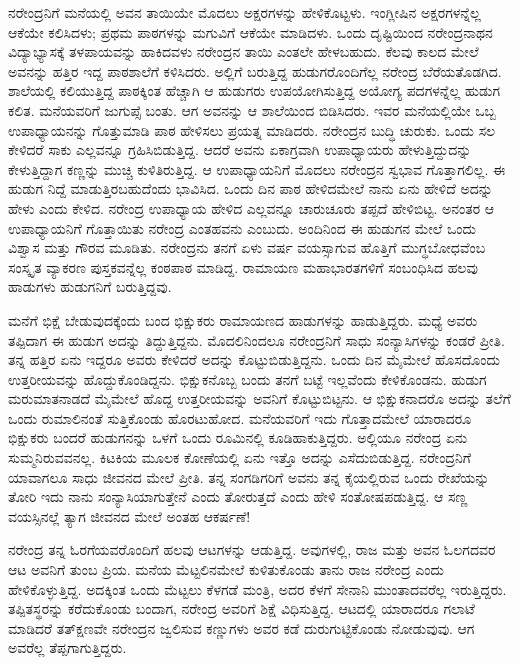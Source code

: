 ನರೇಂದ್ರನಿಗೆ ಮನೆಯಲ್ಲಿ ಅವನ ತಾಯಿಯೇ ಮೊದಲು ಅಕ್ಷರಗಳನ್ನು ಹೇಳಿಕೊಟ್ಟಳು. ಇಂಗ್ಲೀಷಿನ ಅಕ್ಷರಗಳನ್ನೆಲ್ಲ ಆಕೆಯೇ ಕಲಿಸಿದಳು; ಪ್ರಥಮ ಪಾಠಗಳನ್ನು ಮಗುವಿಗೆ ಆಕೆಯೇ ಮಾಡಿದಳು. ಒಂದು ದೃಷ್ಟಿಯಿಂದ ನರೇಂದ್ರನಾಥನ ವಿದ್ಯಾಭ್ಯಾಸಕ್ಕೆ ತಳಪಾಯವನ್ನು ಹಾಕಿದವಳು ನರೇಂದ್ರನ ತಾಯಿ ಎಂತಲೇ ಹೇಳಬಹುದು. ಕೆಲವು ಕಾಲದ ಮೇಲೆ ಅವನನ್ನು ಹತ್ತಿರ ಇದ್ದ ಪಾಠಶಾಲೆಗೆ ಕಳಿಸಿದರು. ಅಲ್ಲಿಗೆ ಬರುತ್ತಿದ್ದ ಹುಡುಗರೊಂದಿಗೆಲ್ಲ ನರೇಂದ್ರ ಬೆರೆಯತೊಡಗಿದ. ಶಾಲೆಯಲ್ಲಿ ಕಲಿಯುತ್ತಿದ್ದ ಪಾಠಕ್ಕಿಂತ ಹೆಚ್ಚಾಗಿ ಆ ಹುಡುಗರು ಉಪಯೋಗಿಸುತ್ತಿದ್ದ ಅಯೋಗ್ಯ ಪದಗಳನ್ನೆಲ್ಲ ಹುಡುಗ ಕಲಿತ. ಮನೆಯವರಿಗೆ ಜುಗುಪ್ಸೆ ಬಂತು. ಆಗ ಅವನನ್ನು ಆ ಶಾಲೆಯಿಂದ ಬಿಡಿಸಿದರು. ಇವರ ಮನೆಯಲ್ಲಿಯೇ ಒಬ್ಬ ಉಪಾಧ್ಯಾಯನನ್ನು ಗೊತ್ತುಮಾಡಿ ಪಾಠ ಹೇಳಿಸಲು ಪ್ರಯತ್ನ ಮಾಡಿದರು. ನರೇಂದ್ರನ ಬುದ್ಧಿ ಚುರುಕು. ಒಂದು ಸಲ ಕೇಳಿದರೆ ಸಾಕು ಎಲ್ಲವನ್ನೂ ಗ್ರಹಿಸಿಬಿಡುತ್ತಿದ್ದ. ಆದರೆ ಅವನು ಏಕಾಗ್ರವಾಗಿ ಉಪಾಧ್ಯಾಯರು ಹೇಳುತ್ತಿದ್ದುದನ್ನು ಕೇಳುತ್ತಿದ್ದಾಗ ಕಣ್ಣನ್ನು ಮುಚ್ಚಿ ಕುಳಿತಿರುತ್ತಿದ್ದ. ಆ ಉಪಾಧ್ಯಾಯನಿಗೆ ಮೊದಲು ನರೇಂದ್ರನ ಸ್ವಭಾವ ಗೊತ್ತಾಗಲಿಲ್ಲ. ಈ ಹುಡುಗ ನಿದ್ದೆ ಮಾಡುತ್ತಿರಬಹುದೆಂದು ಭಾವಿಸಿದ. ಒಂದು ದಿನ ಪಾಠ ಹೇಳಿದಮೇಲೆ ನಾನು ಏನು ಹೇಳಿದೆ ಅದನ್ನು ಹೇಳು ಎಂದು ಕೇಳಿದ. ನರೇಂದ್ರ ಉಪಾಧ್ಯಾಯ ಹೇಳಿದ ಎಲ್ಲವನ್ನೂ ಚಾರುಚೂರು ತಪ್ಪದೆ ಹೇಳಿಬಿಟ್ಟ. ಅನಂತರ ಆ ಉಪಾಧ್ಯಾಯನಿಗೆ ಗೊತ್ತಾಯಿತು ನರೇಂದ್ರ ಎಂತಹವನು ಎಂಬುದು. ಅಂದಿನಿಂದ ಈ ಹುಡುಗನ ಮೇಲೆ ಒಂದು ವಿಶ್ವಾಸ ಮತ್ತು ಗೌರವ ಮೂಡಿತು. ನರೇಂದ್ರನು ತನಗೆ ಏಳು ವರ್ಷ ವಯಸ್ಸಾಗುವ ಹೊತ್ತಿಗೆ ಮುಗ್ಧಬೋಧವೆಂಬ ಸಂಸ್ಕೃತ ವ್ಯಾಕರಣ ಪುಸ್ತಕವನ್ನೆಲ್ಲ ಕಂಠಪಾಠ ಮಾಡಿದ್ದ. ರಾಮಾಯಣ ಮಹಾಭಾರತಗಳಿಗೆ ಸಂಬಂಧಿಸಿದ ಹಲವು ಹಾಡುಗಳು ಹುಡುಗನಿಗೆ ಬರುತ್ತಿದ್ದವು.

ಮನೆಗೆ ಭಿಕ್ಷೆ ಬೇಡುವುದಕ್ಕೆಂದು ಬಂದ ಭಿಕ್ಷುಕರು ರಾಮಾಯಣದ ಹಾಡುಗಳನ್ನು ಹಾಡುತ್ತಿದ್ದರು. ಮಧ್ಯೆ ಅವರು ತಪ್ಪಿದಾಗ ಈ ಹುಡುಗ ಅದನ್ನು ತಿದ್ದುತ್ತಿದ್ದನು. ಮೊದಲಿನಿಂದಲೂ ನರೇಂದ್ರನಿಗೆ ಸಾಧು ಸಂನ್ಯಾಸಿಗಳನ್ನು ಕಂಡರೆ ಪ್ರೀತಿ. ತನ್ನ ಹತ್ತಿರ ಏನು ಇದ್ದರೂ ಅವರು ಕೇಳಿದರೆ ಅದನ್ನು ಕೊಟ್ಟುಬಿಡುತ್ತಿದ್ದನು. ಒಂದು ದಿನ ಮೈಮೇಲೆ ಹೊಸದೊಂದು ಉತ್ತರೀಯವನ್ನು ಹೊದ್ದುಕೊಂಡಿದ್ದನು. ಭಿಕ್ಷುಕನೊಬ್ಬ ಬಂದು ತನಗೆ ಬಟ್ಟೆ ಇಲ್ಲವೆಂದು ಕೇಳಿಕೊಂಡನು. ಹುಡುಗ ಮರುಮಾತನಾಡದೆ ಮೈಮೇಲೆ ಹೊದ್ದ ಉತ್ತರೀಯವನ್ನು ಅವನಿಗೆ ಕೊಟ್ಟುಬಿಟ್ಟನು. ಆ ಭಿಕ್ಷುಕನಾದರೊ ಅದನ್ನು ತಲೆಗೆ ಒಂದು ರುಮಾಲಿನಂತೆ ಸುತ್ತಿಕೊಂಡು ಹೊರಟುಹೋದ. ಮನೆಯವರಿಗೆ ಇದು ಗೊತ್ತಾದಮೇಲೆ ಯಾರಾದರೂ ಭಿಕ್ಷುಕರು ಬಂದರೆ ಹುಡುಗನನ್ನು ಒಳಗೆ ಒಂದು ರೂಮಿನಲ್ಲಿ ಕೂಡಿಹಾಕುತ್ತಿದ್ದರು. ಅಲ್ಲಿಯೂ ನರೇಂದ್ರ ಏನು ಸುಮ್ಮನಿರುವವನಲ್ಲ. ಕಿಟಕಿಯ ಮೂಲಕ ಕೋಣೆಯಲ್ಲಿ ಏನು ಇತ್ತೊ ಅದನ್ನು ಎಸೆದುಬಿಡುತ್ತಿದ್ದ. ನರೇಂದ್ರನಿಗೆ ಯಾವಾಗಲೂ ಸಾಧು ಜೀವನದ ಮೇಲೆ ಪ್ರೀತಿ. ತನ್ನ ಸಂಗಡಿಗರಿಗೆ ಅವನು ತನ್ನ ಕೈಯಲ್ಲಿರುವ ಒಂದು ರೇಖೆಯನ್ನು ತೋರಿ ಇದು ನಾನು ಸಂನ್ಯಾಸಿಯಾಗುತ್ತೇನೆ ಎಂದು ತೋರುತ್ತದೆ ಎಂದು ಹೇಳಿ ಸಂತೋಷಪಡುತ್ತಿದ್ದ. ಆ ಸಣ್ಣ ವಯಸ್ಸಿನಲ್ಲೆ ತ್ಯಾಗ ಜೀವನದ ಮೇಲೆ ಅಂತಹ ಆಕರ್ಷಣೆ!

ನರೇಂದ್ರ ತನ್ನ ಓರಗೆಯವರೊಂದಿಗೆ ಹಲವು ಆಟಗಳನ್ನು ಆಡುತ್ತಿದ್ದ. ಅವುಗಳಲ್ಲಿ, ರಾಜ ಮತ್ತು ಅವನ ಓಲಗದವರ ಆಟ ಅವನಿಗೆ ತುಂಬ ಪ್ರಿಯ. ಮನೆಯ ಮೆಟ್ಟಲಿನಮೇಲೆ ಕುಳಿತುಕೊಂಡು ತಾನು ರಾಜ ನರೇಂದ್ರ ಎಂದು ಹೇಳಿಕೊಳ್ಳುತ್ತಿದ್ದ. ಅದಕ್ಕಿಂತ ಒಂದು ಮೆಟ್ಟಲು ಕೆಳಗಡೆ ಮಂತ್ರಿ, ಅದರ ಕೆಳಗೆ ಸೇನಾನಿ ಮುಂತಾದವರೆಲ್ಲ ಇರುತ್ತಿದ್ದರು. ತಪ್ಪಿತಸ್ಥರನ್ನು ಕರೆದುಕೊಂಡು ಬಂದಾಗ, ನರೇಂದ್ರ ಅವರಿಗೆ ಶಿಕ್ಷೆ ವಿಧಿಸುತ್ತಿದ್ದ. ಆಟದಲ್ಲಿ ಯಾರಾದರೂ ಗಲಾಟೆ ಮಾಡಿದರೆ ತತ್‍ಕ್ಷಣವೇ ನರೇಂದ್ರನ ಜ್ವಲಿಸುವ ಕಣ್ಣುಗಳು ಅವರ ಕಡೆ ದುರುಗುಟ್ಟಿಕೊಂಡು ನೋಡುವುವು. ಆಗ ಅವರೆಲ್ಲ ತೆಪ್ಪಗಾಗುತ್ತಿದ್ದರು.

